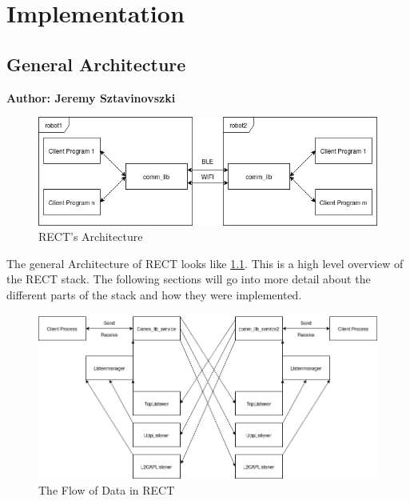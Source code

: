 \chapter{Implementation}

\section{General Architecture}
\textbf{Author: Jeremy Sztavinovszki}
\begin{figure}
	\centering

	\includegraphics[width=\textwidth]{img/RECT-Architecture}
	
	\caption{RECT's Architecture}
	\label{fig:rect-architecture}
\end{figure}

The general Architecture of RECT looks like \ref{fig:rect-architecture}. This is a high level overview of the RECT stack.
The following sections will go into more detail about the different parts of the stack and how they were implemented.

\begin{figure}
	\centering

	\includegraphics[width=\textwidth]{img/RECT-dataflow}

	\caption{The Flow of Data in RECT}
	\label{fig:rect-dataflow}

\end{figure}

